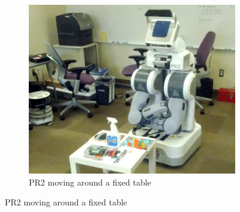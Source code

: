 \documentclass[letterpaper, 10 pt, conference]{ieeeconf}  %
\begin{document}
\begin{figure}[t]
        \begin{center}
	\centering
        \begin{subfigure}[b]{0.71\linewidth}
                \centering
                \includegraphics[width=\linewidth]{../tizer/pr2.jpg}
                \caption{PR2 moving around a fixed table}                
        \end{subfigure}%
        \end{center}
        

\end{figure}
\end{document}
